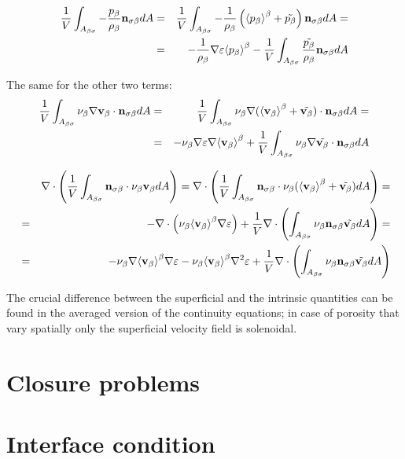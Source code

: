 \begin{eqnarray}
\dfrac{1}{V} \int_{A_{\beta \sigma}}  -\dfrac{p_{\beta}}{\rho_{\beta}} \mathbf{n}_{\sigma \beta} dA &=& \dfrac{1}{V} \int_{A_{\beta \sigma}}  -\dfrac{1}{\rho_{\beta}} \left({\left< p_{\beta} \right>}^{\beta}  + \tilde{p_{\beta}}\right) \mathbf{n}_{\sigma \beta} dA = \nonumber \\
&=& -\dfrac{1}{\rho_{\beta}}\nabla\varepsilon {\left< p_{\beta}\right>}^{\beta} - \dfrac{1}{V} \int_{A_{\beta \sigma}} \dfrac{\tilde{p_{\beta}}}{\rho_{\beta}} \mathbf{n}_{\sigma \beta} dA
\end{eqnarray}

The same for the other two terms:
\begin{eqnarray}
\dfrac{1}{V} \int_{A_{\beta \sigma}} \nu_{\beta} \nabla \textbf{v}_{\beta} \cdot \mathbf{n}_{\sigma \beta} dA &=& \dfrac{1}{V} \int_{A_{\beta \sigma}} \nu_{\beta} \nabla ({\left< \textbf{v}_{\beta} \right>}^{\beta} +\tilde{\textbf{v}_{\beta}}) \cdot \mathbf{n}_{\sigma \beta} dA =  \nonumber \\
&=& - \nu_{\beta} \nabla \varepsilon \nabla {\left< \textbf{v}_{\beta}\right>}^{\beta} + \dfrac{1}{V} \int_{A_{\beta \sigma}} \nu_{\beta} \nabla \tilde{\textbf{v}_{\beta}} \cdot \mathbf{n}_{\sigma \beta} dA
\end{eqnarray}

\begin{eqnarray}
&&\nabla \cdot \left( \dfrac{1}{V} \int_{A_{\beta \sigma}} \mathbf{n}_{\sigma \beta} \cdot \nu_{\beta} \textbf{v}_{\beta} dA \right) = \nabla \cdot \left( \dfrac{1}{V} \int_{A_{\beta \sigma}} \mathbf{n}_{\sigma \beta} \cdot \nu_{\beta} ({\left< \textbf{v}_{\beta} \right>}^{\beta} +\tilde{\textbf{v}_{\beta}}) dA \right) =  \nonumber \\
&=& -\nabla \cdot \left( \nu_{\beta} {\left< \textbf{v}_{\beta} \right>}^{\beta} \nabla \varepsilon \right) + \dfrac{1}{V} \nabla \cdot \left(\int_{A_{\beta \sigma}}  \nu_{\beta} \mathbf{n}_{\sigma \beta} \tilde{\textbf{v}_{\beta}} dA \right) =  \nonumber \\
&=& -\nu_{\beta}  \nabla  {\left< \textbf{v}_{\beta}\right>}^{\beta} \nabla \varepsilon -\nu_{\beta} {\left< \textbf{v}_{\beta} \right>}^{\beta} \nabla^2 \varepsilon + \dfrac{1}{V} \nabla \cdot \left(\int_{A_{\beta \sigma}}  \nu_{\beta} \mathbf{n}_{\sigma \beta} \tilde{\textbf{v}_{\beta}} dA \right)
\end{eqnarray}

The crucial difference between the superficial and the intrinsic quantities can be found in the averaged version of the continuity equations; in case of porosity that vary spatially only the superficial velocity field is solenoidal.


\section{Closure problems}

\section{Interface condition}

